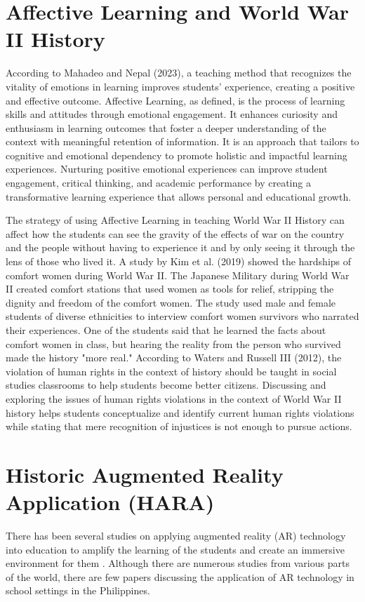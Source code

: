 \section{Affective Learning and World War II History}
According to Mahadeo and Nepal (2023), a teaching method that recognizes the vitality of emotions in learning improves students' experience, creating a positive and effective outcome. Affective Learning, as defined, is the process of learning skills and attitudes through emotional engagement. It enhances curiosity and enthusiasm in learning outcomes that foster a deeper understanding of the context with meaningful retention of information. It is an approach that tailors to cognitive and emotional dependency to promote holistic and impactful learning experiences. Nurturing positive emotional experiences can improve student engagement, critical thinking, and academic performance by creating a transformative learning experience that allows personal and educational growth.

The strategy of using Affective Learning in teaching World War II History can affect how the students can see the gravity of the effects of war on the country and the people without having to experience it and by only seeing it through the lens of those who lived it. A study by Kim et al. (2019) showed the hardships of comfort women during World War II. The Japanese Military during World War II created comfort stations that used women as tools for relief, stripping the dignity and freedom of the comfort women. The study used male and female students of diverse ethnicities to interview comfort women survivors who narrated their experiences. One of the students said that he learned the facts about comfort women in class, but hearing the reality from the person who survived made the history "more real." According to Waters and Russell III (2012), the violation of human rights in the context of history should be taught in social studies classrooms to help students become better citizens. Discussing and exploring the issues of human rights violations in the context of World War II history helps students conceptualize and identify current human rights violations while stating that mere recognition of injustices is not enough to pursue actions.

\section{Historic Augmented Reality Application (HARA)}
There has been several studies on applying augmented reality (AR) technology into education to amplify the learning of the students and create an immersive environment for them \cite{ARVRRome}. Although there are numerous studies from various parts of the world, there are few papers discussing the application of AR technology in school settings in the Philippines. 

